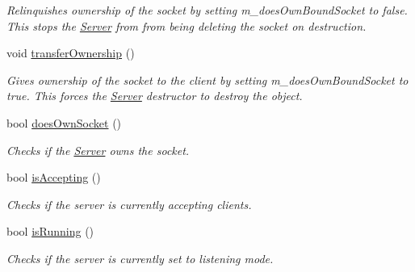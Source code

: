 \begin{DoxyCompactItemize}
\begin{DoxyCompactList}\small\item\em Relinquishes ownership of the socket by setting m\+\_\+does\+Own\+Bound\+Socket to false. This stops the \hyperlink{class_communication_1_1_server}{Server} from from being deleting the socket on destruction. \end{DoxyCompactList}\item 
void \hyperlink{class_communication_1_1_server_aa2e19a107eeaa9e4409654c99972b702}{transfer\+Ownership} ()
\begin{DoxyCompactList}\small\item\em Gives ownership of the socket to the client by setting m\+\_\+does\+Own\+Bound\+Socket to true. This forces the \hyperlink{class_communication_1_1_server}{Server} destructor to destroy the object. \end{DoxyCompactList}\item 
bool \hyperlink{class_communication_1_1_server_aeb511c766005b9b22208778adb80f66f}{does\+Own\+Socket} ()
\begin{DoxyCompactList}\small\item\em Checks if the \hyperlink{class_communication_1_1_server}{Server} owns the socket. \end{DoxyCompactList}\item 
bool \hyperlink{class_communication_1_1_server_a0f85511b0e8445f57f9226b4b1d2579b}{is\+Accepting} ()
\begin{DoxyCompactList}\small\item\em Checks if the server is currently accepting clients. \end{DoxyCompactList}\item 
bool \hyperlink{class_communication_1_1_server_ad9e57ab4ca738330f8052978034eea3b}{is\+Running} ()
\begin{DoxyCompactList}\small\item\em Checks if the server is currently set to listening mode. \end{DoxyCompactList}\end{DoxyCompactItemize}
